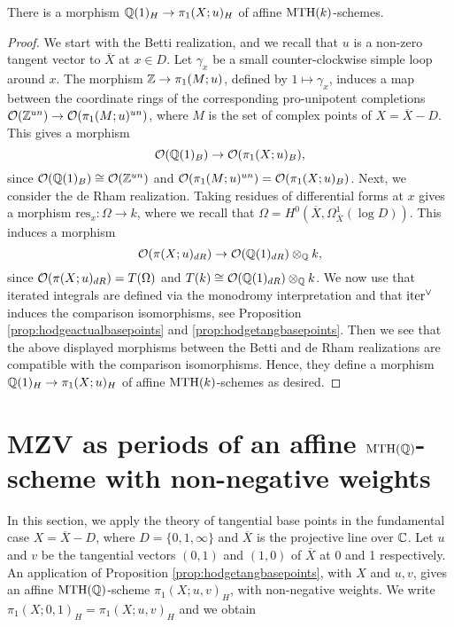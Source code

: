 \begin{prop}
There is a morphism $\mathbb{Q}(1)_H \to \pi_1(X;u)_H$ of affine $\mathrm{MTH}(k)$-schemes.
\end{prop}
\begin{proof}
We start with the Betti realization, and we recall that $u$ is a non-zero tangent vector to $\overline{X}$ at $x\in D$. 
Let $\gamma_x$ be a small counter-clockwise simple loop around $x$. 
The morphism $\mathbb{Z}\to \pi_1(M;u)$, defined by $1 \mapsto \gamma_x$, induces a map between the coordinate rings of the corresponding pro-unipotent completions $\mathcal{O}(\mathbb{Z}^{un})\to \mathcal{O}(\pi_1(M;u)^{un})$, where $M$ is  the set of complex points of $X=\overline{X}-D$. 
This gives a morphism
$$\mathcal{O}(\mathbb{Q}(1)_B)\to \mathcal{O}(\pi_1(X;u)_B),$$
since $\mathcal{O}(\mathbb{Q}(1)_B)\cong \mathcal{O}(\mathbb{Z}^{un})$ and  $\mathcal{O}(\pi_1(M;u)^{un})=\mathcal{O}(\pi_1(X;u)_B)$. Next, we consider the de Rham realization. 
Taking residues of differential forms at $x$ gives a morphism $\mathrm{res}_x : \Omega \to k$, where we recall that $\Omega=H^0(\overline{X},\Omega^1_{\overline{X}}(\log D))$. This induces a morphism
$$
\mathcal{O}(\pi(X;u)_{dR})\to \mathcal{O}(\mathbb{Q}(1)_{dR})\otimes_{\mathbb{Q}} k,
$$
since $\mathcal{O}(\pi(X;u)_{dR})=T(\Omega)$ and $T(k)\cong \mathcal{O}(\mathbb{Q}(1)_{dR})\otimes_{\mathbb{Q}}k$.
We now use that iterated integrals are defined via the monodromy interpretation and that $\mathrm{iter}^{\vee}$ induces the comparison isomorphisms, see Proposition \ref{prop:hodgeactualbasepoints} and \ref{prop:hodgetangbasepoints}. 
Then we see that the above displayed morphisms between the Betti and de Rham realizations are compatible with the comparison isomorphisms. Hence, they define a morphism $\mathbb{Q}(1)_H \to \pi_1(X;u)_H$ of affine $\mathrm{MTH}(k)$-schemes as desired.
\end{proof}


\section{MZV as periods of an affine $\textnormal{MTH}(\mathbb{Q})$-scheme with non-negative weights}

In this section, we apply the theory of tangential base points in the fundamental case $X=\overline{X}-D$, where
$D= \{0,1,\infty\}$ and  $\overline{X}$ is the projective line over $\mathbb{C}$. Let $u$ and $v$ be the tangential vectors $(0,1)$ and $(1,0)$ of $\overline{X}$ at 0 and 1 respectively. An application of Proposition \ref{prop:hodgetangbasepoints}, with $X$ and $u,v$, gives an affine $\textnormal{MTH}(\mathbb{Q})$-scheme $\pi_1(X;u,v)_H$, with non-negative weights. We write $\pi_1(X;0,1)_H=\pi_1(X;u,v)_H$ and we obtain


